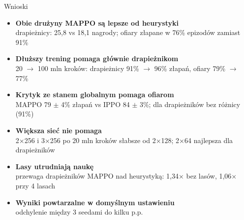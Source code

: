\documentclass[aspectratio=169,10pt]{beamer}
\begin{document}
\begin{frame}{Wnioski}
  \begin{itemize}
    \setlength{\itemsep}{3pt}
    \item \textbf{Obie drużyny MAPPO są lepsze od heurystyki}\\
      {\small drapieżnicy: 25,8 vs 18,1 nagrody; ofiary złapane w 76\% epizodów zamiast 91\%}
    \item \textbf{Dłuższy trening pomaga głównie drapieżnikom}\\
      {\small 20 $\to$ 100 mln kroków: drapieżnicy 91\% $\to$ 96\% złapań, ofiary 79\% $\to$ 77\%}
    \item \textbf{Krytyk ze stanem globalnym pomaga ofiarom}\\
      {\small MAPPO 79 $\pm$ 4\% złapań vs IPPO 84 $\pm$ 3\%; dla drapieżników bez różnicy (91\%)}
    \item \textbf{Większa sieć nie pomaga}\\
      {\small 2×256 i 3×256 po 20 mln kroków słabsze od 2×128; 2×64 najlepsza dla drapieżników}
    \item \textbf{Lasy utrudniają naukę}\\
      {\small przewaga drapieżników MAPPO nad heurystyką: 1,34× bez lasów, 1,06× przy 4 lasach}
    \item \textbf{Wyniki powtarzalne w domyślnym ustawieniu}\\
      {\small odchylenie między 3 seedami do kilku p.p.}
  \end{itemize}
\end{frame}
\end{document}

